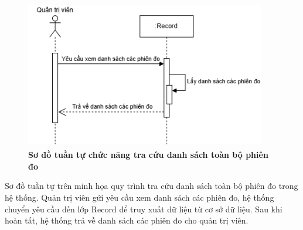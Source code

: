 \begin{figure}[H]
	\centering
	\includegraphics[width=10.5cm,height=6.5cm]{Images/sequence/record/getAll.drawio.png}
	\caption[Sơ đồ tuần tự chức năng tra cứu danh sách toàn bộ phiên đo]{\bfseries \fontsize{12pt}{0pt}
		\selectfont Sơ đồ tuần tự chức năng tra cứu danh sách toàn bộ phiên đo}
	\label{sequence_get_all_record} %
\end{figure}
Sơ đồ tuần tự trên minh họa quy trình tra cứu danh sách toàn bộ phiên đo trong hệ thống. Quản trị viên gửi yêu cầu xem danh sách các phiên đo,
hệ thống chuyển yêu cầu đến lớp Record để truy xuất dữ liệu từ cơ sở dữ liệu. Sau khi hoàn tất, hệ thống trả về danh sách các phiên đo cho quản trị viên.

